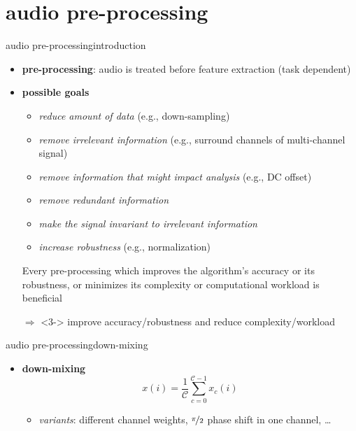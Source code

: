     \section[pre-proc]{audio pre-processing}
        \begin{frame}{audio pre-processing}{introduction}
            \begin{itemize}
                \item   \textbf{pre-processing}: audio is treated before feature extraction (task dependent)
                \bigskip
                \item<2->   \textbf{possible goals} 
                    \begin{itemize}
                        \item   \textit{reduce amount of data} (e.g., down-sampling)
                        \item   \textit{remove irrelevant information} (e.g., surround channels of multi-channel signal)
                        \item   \textit{remove information that might impact analysis} (e.g., DC offset)
                        \item   \textit{remove redundant information}
                        \item   \textit{make the signal invariant to irrelevant information}
                        \item   \textit{increase robustness} (e.g., normalization)
                    \end{itemize}Every pre-processing which improves the algorithm’s accuracy or its robustness,
or minimizes its complexity or computational workload is beneficial
                \bigskip
                \item[$\Rightarrow$]<3-> improve accuracy/robustness and reduce complexity/workload
            \end{itemize}
        \end{frame}
        \begin{frame}{audio pre-processing}{down-mixing}
            \begin{itemize}
                \item   \textbf{down-mixing}
                    \[
                        x(i) = \frac{1}{\mathcal{C}}\sum\limits_{c=0}^{\mathcal{C}-1}{x_c(i)} 
                    \]
                    \begin{itemize}
                        \item   \textit{variants}: different channel weights, $\nicefrac{\pi}{2}$ phase shift in one channel, \ldots
                    \end{itemize}
                    
            \end{itemize}
        \end{frame}
